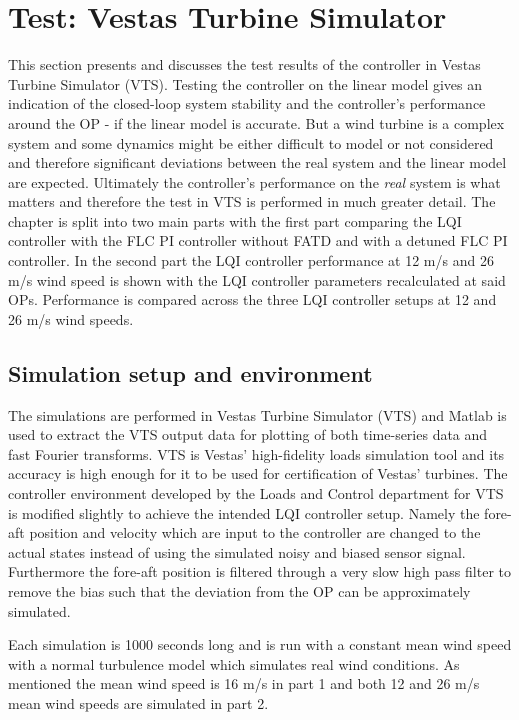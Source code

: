 \section{Test: Vestas Turbine Simulator} \label{sec:test_vts}
This section presents and discusses the test results of the controller in Vestas Turbine Simulator (VTS). Testing the controller on the linear model gives an indication of the closed-loop system stability and the controller's performance around the OP - if the linear model is accurate. But a wind turbine is a complex system and some dynamics might be either difficult to model or not considered and therefore significant deviations between the real system and the linear model are expected. Ultimately the controller's performance on the \textit{real} system is what matters and therefore the test in VTS is performed in much greater detail. The chapter is split into two main parts with the first part comparing the LQI controller with the FLC PI controller without FATD and with a detuned FLC PI controller. In the second part the LQI controller performance at 12 m/s and 26 m/s wind speed is shown with the LQI controller parameters recalculated at said OPs. Performance is compared across the three LQI controller setups at 12 and 26 m/s wind speeds.

\subsection{Simulation setup and environment}
The simulations are performed in Vestas Turbine Simulator (VTS) and Matlab is used to extract the VTS output data for plotting of both time-series data and fast Fourier transforms. VTS is Vestas' high-fidelity loads simulation tool and its accuracy is high enough for it to be used for certification of Vestas' turbines. The controller environment developed by the Loads and Control department for VTS is modified slightly to achieve the intended LQI controller setup. Namely the fore-aft position and velocity which are input to the controller are changed to the actual states instead of using the simulated noisy and biased sensor signal. Furthermore the fore-aft position is filtered through a very slow high pass filter to remove the bias such that the deviation from the OP can be approximately simulated.

\smallskip
Each simulation is 1000 seconds long and is run with a constant mean wind speed with a normal turbulence model which simulates real wind conditions. As mentioned the mean wind speed is 16 m/s in part 1 and both 12 and 26 m/s mean wind speeds are simulated in part 2.

